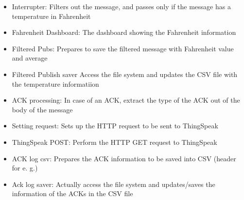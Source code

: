 \documentclass{article}
\begin{document}
\begin{itemize}
    \item Interrupter: Filters out the message, and passes only if the message has a temperature in Fahrenheit
    \item Fahrenheit Dashboard: The dashboard showing the Fahrenheit information
    \item Filtered Pubs: Prepares to save the filtered message with Fahrenheit value and average
    \item Filtered Publish saver Access the file system and updates the CSV file with the temperature informatiion
    \item ACK processing: In case  of an ACK, extract the type of the ACK out of the body of the message
    \item Setting request: Sets up the HTTP request to be sent to ThingSpeak
    \item ThingSpeak POST: Perform the HTTP GET request to ThingSpeak
    \item ACK log csv: Prepares the ACK information to be saved into CSV (header for e. g.)
    \item Ack log saver: Actually access the file system and updates/saves the information of the ACKs in the CSV file
\end{itemize}
\end{document}
